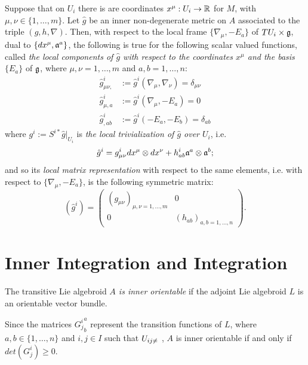 Suppose that on $U_i$ there is are coordinates $x^\mu: U_i \to \mathbb{R}$ for $M$, with $\mu, \nu \in \{1, \dots, m\}$. Let $\hat g$ be an inner non-degenerate metric on $A$ associated to the triple $(g, h, \nabla)$. Then, with respect to the local frame $\{\nabla_\mu, -E_a\}$ of $TU_i \times \mathfrak{g}$, dual to $\{dx^\mu, \mathfrak{a}^a\}$, the following is true for the following scalar valued functions, called \emph{the local components of $\hat g$ with respect to the coordinates $x^\mu$ and the basis $\{E_a\}$} of $\mathfrak{g}$, where $\mu, \nu = 1, \dots, m$ and $a, b = 1, \dots, n$:
\begin{align*}
    \hat g^i_{\mu \nu,}& := \hat g^i(\nabla_\mu, \nabla_\nu) = \delta_{\mu \nu}\\
    \hat g^i_{\mu, a} &:= \hat g^i(\nabla_\mu, -E_a)=0\\
    \hat g^i_{,ab} &:= \hat g^i(-E_a, -E_b) = \delta_{ab}
\end{align*}
where $g^i := S^{i*}\hat g|_{U_i}$ is \emph{the local trivialization of $\hat g$ over $U_i$}, i.e.
\begin{equation}
    \hat g^i = g^i_{\mu \nu} dx^\mu\otimes dx^\nu + h^i_{ab} \mathfrak{a}^a \otimes \mathfrak{a}^b;
\end{equation}
and so its \emph{local matrix representation} with respect to the same elements, i.e. with respect to $\{\nabla_\mu, -E_a\}$, is the following symmetric matrix:
\begin{equation}
    (\hat g^i) = \begin{pmatrix}  (g_{\mu \nu})_{\mu, \nu = 1, \dots, m} & 0 \\ 0 & (h_{a b})_{a, b = 1, \dots, n} \end{pmatrix}.
\end{equation}


\section{Inner Integration and Integration}

\begin{definition}
The transitive Lie algebroid \emph{$A$ is inner orientable} if the adjoint Lie algebroid $L$ is an orientable vector bundle.
\end{definition}

Since the matrices ${G^i_j}^a_b$ represent the transition functions of $L$, where $a, b \in \{1, \dots, n\}$ and $i, j \in I$ such that $U_{ij \neq \empty}$ , $A$ is inner orientable if and only if $det({G^i_j}) \geq 0$.

